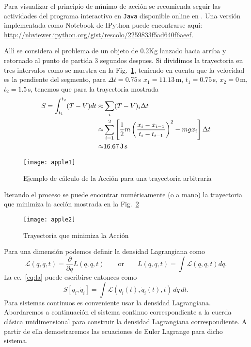 Para visualizar el principio de m\'\i nimo de acci\'on se recomienda seguir las actividades del programa interactivo en \texttt{Java} disponible online en \cite{JavaAP}. 
Una versión implementada como Notebook de IPython puede encontrarse aqui: \url{http://nbviewer.ipython.org/gist/rescolo/2259833f5ad640f6aeef}.

All\'\i{} se considera el problema de un objeto de 0.2Kg lanzado hacia arriba y retornado al punto de partida 3 segundos despues. Si dividimos la trayectoria en tres intervalos como se muestra en la Fig.~\ref{fig:apple1}, teniendo en cuenta que la velocidad es la pendiente del segmento, para $\Delta t=0.75\,$s $x_1=11.13\,$m, $t_1=0.75\,$s, $x_2=0\,$m, $t_2=1.5\,$s, tenemos que para la trayectoria mostrada
\begin{align}
  S=\int_{t_1}^{t_2}(T-V)dt\approx&\sum_i(T-V)_i\Delta t\nonumber\\
  \approx&\sum_{i=1}^2\left[\frac{1}{2}m\left(\frac{x_i-x_{i-1}}{t_i-t_{i-1}}\right)^2-m g x_i\right]\Delta t\nonumber\\
  \approx&16.67\,\text{J\,s}
\end{align}
\begin{figure}
  \centering
  \texttt{[image: apple1]}
  \caption{Ejemplo de c\'alculo de la Acci\'on para una trayectoria arbitraria}
  \label{fig:apple1}
\end{figure}
Iterando el proceso se puede encontrar num\'ericamente (o a mano) la trayectoria que minimiza la acci\'on mostrada en la Fig.~\ref{fig:apple2}
\begin{figure}
  \centering
\texttt{[image: apple2]}
  \caption{Trayectoria que minimiza la Acci\'on}
\label{fig:apple2}
\end{figure}
Para una dimensi\'on podemos definir la densidad Lagrangiana como
\begin{equation}
  \mathcal{L}(q,\dot q,t)=\frac{\partial}{\partial q}L(q,\dot q,t)\qquad\text{or}\qquad L(q,\dot q,t)=\int\mathcal{L}(q,\dot q,t)dq.
\end{equation}
La ec.~\eqref{eq:la} puede escribirse entonces como
\begin{equation}
   S\left[q_i,\dot{q}_i\right] = \int \mathcal{L}(q_i(t), \dot{q}_i(t),t)\, dq\,dt.
\end{equation}
Para sistemas continuos es conveniente usar la densidad Lagrangiana. Abordaremos a continuaci\'on el sistema continuo correspondiente a la cuerda cl\'asica unidimensional para construir la densidad Lagrangiana correspondiente. A partir de ella demostraremos las ecuaciones de Euler Lagrange para dicho sistema.

